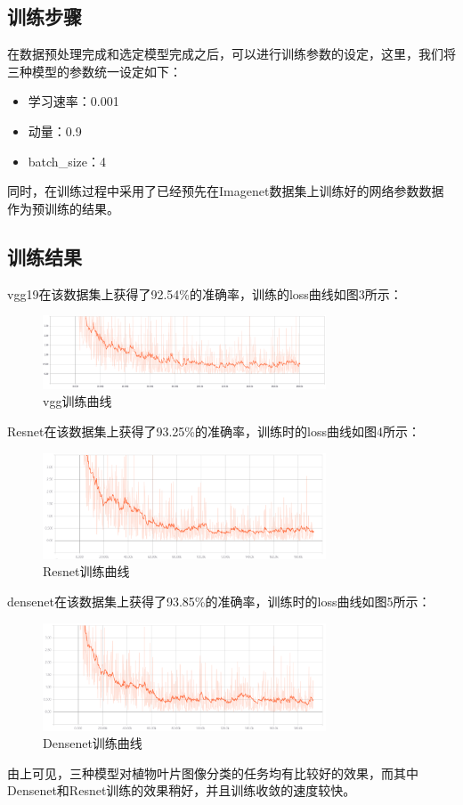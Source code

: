 \documentclass[a4paper]{ctexart} %
\begin{document}
\subsection*{训练步骤}
在数据预处理完成和选定模型完成之后，可以进行训练参数的设定，这里，我们将三种模型的参数统一设定如下：
\begin{itemize}
	\item 学习速率：0.001
	\item 动量：0.9
	\item batch\_size：4
\end{itemize}
同时，在训练过程中采用了已经预先在Imagenet数据集上训练好的网络参数数据作为预训练的结果。

\subsection*{训练结果}
vgg19在该数据集上获得了92.54\%的准确率，训练的loss曲线如图3所示：

\begin{figure}[htbp]
	\centering
	\includegraphics[width=0.75\textwidth]{vgg.png}
	\caption{vgg训练曲线}
	\label{figure}
\end{figure}

Resnet在该数据集上获得了93.25\%的准确率，训练时的loss曲线如图4所示：

\begin{figure}[htbp]
	\centering
	\includegraphics[width=0.75\textwidth]{resnet.png}
	\caption{Resnet训练曲线}
	\label{figure}
\end{figure}

densenet在该数据集上获得了93.85\%的准确率，训练时的loss曲线如图5所示：

\begin{figure}[htbp]
	\centering
	\includegraphics[width=0.75\textwidth]{densenet.png}
	\caption{Densenet训练曲线}
	\label{figure}
\end{figure}
由上可见，三种模型对植物叶片图像分类的任务均有比较好的效果，而其中Densenet和Resnet训练的效果稍好，并且训练收敛的速度较快。
\end{document}
